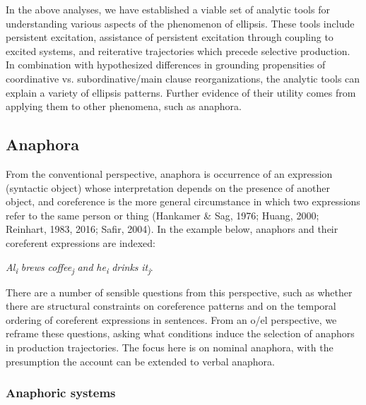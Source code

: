   In the above analyses, we have established a viable set of analytic tools for understanding various aspects of the phenomenon of ellipsis. These tools include persistent excitation, assistance of persistent excitation through coupling to excited systems, and reiterative trajectories which precede selective production. In combination with hypothesized differences in grounding propensities of coordinative vs. subordinative/main clause reorganizations, the analytic tools can explain a variety of ellipsis patterns. Further evidence of their utility comes from applying them to other phenomena, such as anaphora.

\subsection{Anaphora}

From the conventional perspective, anaphora is occurrence of an expression (syntactic object) whose interpretation depends on the presence of another object, and coreference is the more general circumstance in which two expressions refer to the same person or thing (Hankamer \& Sag, 1976; Huang, 2000; Reinhart, 1983, 2016; Safir, 2004). In the example below, anaphors and their coreferent expressions are indexed:

    \textit{Al\textsubscript{i}} \textit{brews} \textit{coffee\textsubscript{j}} \textit{and} \textit{he\textsubscript{i}} \textit{drinks} \textit{it\textsubscript{j}}.

  There are a number of sensible questions from this perspective, such as whether there are structural constraints on coreference patterns and on the temporal ordering of coreferent expressions in sentences. From an o/el perspective, we reframe these questions, asking what conditions induce the selection of anaphors in production trajectories. The focus here is on nominal anaphora, with the presumption the account can be extended to verbal anaphora. 

\subsubsection{Anaphoric systems}


